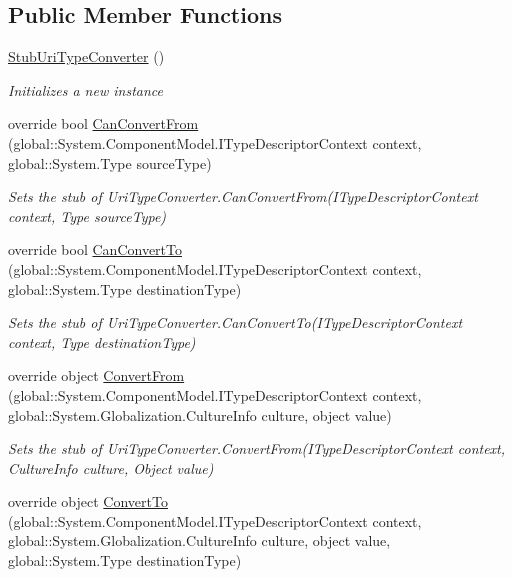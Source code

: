 \subsection*{Public Member Functions}
\begin{DoxyCompactItemize}
\item 
\hyperlink{class_system_1_1_fakes_1_1_stub_uri_type_converter_abcf1a50a087a67307c81695ab8623a6e}{Stub\-Uri\-Type\-Converter} ()
\begin{DoxyCompactList}\small\item\em Initializes a new instance\end{DoxyCompactList}\item 
override bool \hyperlink{class_system_1_1_fakes_1_1_stub_uri_type_converter_a35dc32279190a5d0d9668959c93283b3}{Can\-Convert\-From} (global\-::\-System.\-Component\-Model.\-I\-Type\-Descriptor\-Context context, global\-::\-System.\-Type source\-Type)
\begin{DoxyCompactList}\small\item\em Sets the stub of Uri\-Type\-Converter.\-Can\-Convert\-From(\-I\-Type\-Descriptor\-Context context, Type source\-Type)\end{DoxyCompactList}\item 
override bool \hyperlink{class_system_1_1_fakes_1_1_stub_uri_type_converter_a3d1d131e1b87239b492a52f6ea1d8541}{Can\-Convert\-To} (global\-::\-System.\-Component\-Model.\-I\-Type\-Descriptor\-Context context, global\-::\-System.\-Type destination\-Type)
\begin{DoxyCompactList}\small\item\em Sets the stub of Uri\-Type\-Converter.\-Can\-Convert\-To(\-I\-Type\-Descriptor\-Context context, Type destination\-Type)\end{DoxyCompactList}\item 
override object \hyperlink{class_system_1_1_fakes_1_1_stub_uri_type_converter_aae8aec9fc8030fef5fe2379f82488e6f}{Convert\-From} (global\-::\-System.\-Component\-Model.\-I\-Type\-Descriptor\-Context context, global\-::\-System.\-Globalization.\-Culture\-Info culture, object value)
\begin{DoxyCompactList}\small\item\em Sets the stub of Uri\-Type\-Converter.\-Convert\-From(\-I\-Type\-Descriptor\-Context context, Culture\-Info culture, Object value)\end{DoxyCompactList}\item 
override object \hyperlink{class_system_1_1_fakes_1_1_stub_uri_type_converter_a31b138c2bb64bf5ff383c41c6e4b8a86}{Convert\-To} (global\-::\-System.\-Component\-Model.\-I\-Type\-Descriptor\-Context context, global\-::\-System.\-Globalization.\-Culture\-Info culture, object value, global\-::\-System.\-Type destination\-Type)

\end{DoxyCompactItemize}
